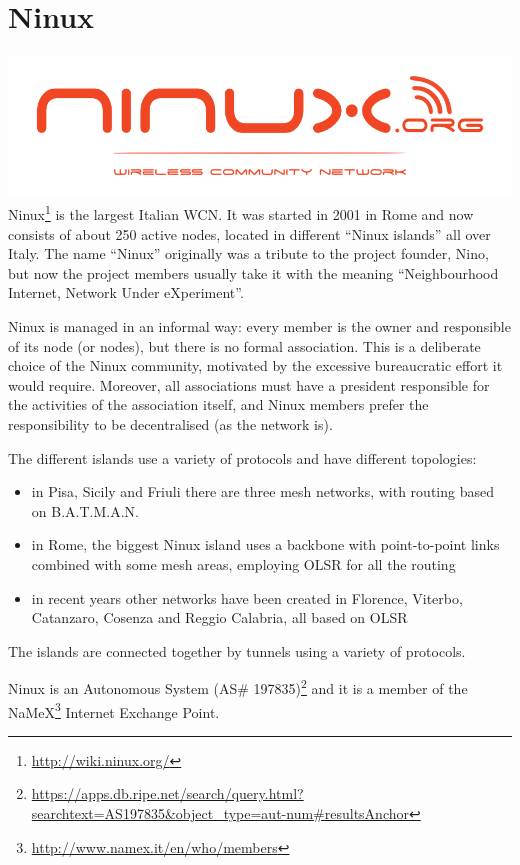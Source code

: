 \documentclass[oneside,openany]{memoir}
\begin{document}
\section{Ninux}\label{ninux}

\includegraphics{images/ninux_logo.png} Ninux\footnote{\url{http://wiki.ninux.org/}}
is the largest Italian WCN. It was started in 2001 in Rome and now
consists of about 250 active nodes, located in different ``Ninux
islands'' all over Italy. The name ``Ninux'' originally was a tribute to
the project founder, Nino, but now the project members usually take it
with the meaning ``Neighbourhood Internet, Network Under eXperiment''.

Ninux is managed in an informal way: every member is the owner and
responsible of its node (or nodes), but there is no formal association.
This is a deliberate choice of the Ninux community, motivated by the
excessive bureaucratic effort it would require. Moreover, all
associations must have a president responsible for the activities of the
association itself, and Ninux members prefer the responsibility to be
decentralised (as the network is).

The different islands use a variety of protocols and have different
topologies:

\begin{itemize}
\itemsep1pt\parskip0pt
\item
  in Pisa, Sicily and Friuli there are three mesh networks, with routing
  based on B.A.T.M.A.N.
\item
  in Rome, the biggest Ninux island uses a backbone with point-to-point
  links combined with some mesh areas, employing OLSR for all the
  routing
\item
  in recent years other networks have been created in Florence, Viterbo,
  Catanzaro, Cosenza and Reggio Calabria, all based on OLSR
\end{itemize}

The islands are connected together by tunnels using a variety of
protocols.

Ninux is an Autonomous System (AS\# 197835)\footnote{\url{https://apps.db.ripe.net/search/query.html?searchtext=AS197835\&object_type=aut-num\#resultsAnchor}}
and it is a member of the NaMeX\footnote{\url{http://www.namex.it/en/who/members}}
Internet Exchange Point.
\end{document}
